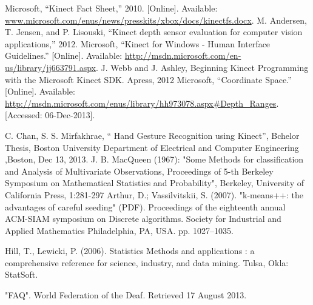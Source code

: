 \documentclass{report}           %
\begin{document}
\begin{thebibliography}{80}
 Microsoft, “Kinect Fact Sheet,” 2010. [Online]. Available: \url{www.microsoft.com/enus/news/presskits/xbox/docs/kinectfs.docx}.
M. Andersen, T. Jensen, and P. Lisouski, “Kinect depth sensor evaluation for computer
vision applications,” 2012.
Microsoft, “Kinect for Windows - Human Interface Guidelines.” [Online]. Available:
\url{http://msdn.microsoft.com/en-us/library/jj663791.aspx}.
J. Webb and J. Ashley, Beginning Kinect Programming with the Microsoft Kinect SDK.
Apress, 2012
Microsoft, “Coordinate Space.” [Online]. Available: \url{http://msdn.microsoft.com/enus/library/hh973078.aspx#Depth\_Ranges}.
[Accessed: 06-Dec-2013].

C. Chan, S. S. Mirfakhrae, “ Hand Gesture Recognition using
Kinect”, Bchelor Thesis, Boston University Department of
Electrical and Computer Engineering ,Boston, Dec 13, 2013.
J. B. MacQueen (1967): "Some Methods for classification and Analysis of Multivariate Observations, Proceedings of 5-th Berkeley Symposium on Mathematical Statistics and Probability", Berkeley, University of California Press, 1:281-297
Arthur, D.; Vassilvitskii, S. (2007). "k-means++: the advantages of careful seeding" (PDF). Proceedings of the eighteenth annual ACM-SIAM symposium on Discrete algorithms. Society for Industrial and Applied Mathematics Philadelphia, PA, USA. pp. 1027–1035.

Hill, T.,  Lewicki, P. (2006). Statistics Methods and applications : a comprehensive reference for science, industry, and data mining. Tulsa, Okla: StatSoft.

 "FAQ". World Federation of the Deaf. Retrieved 17 August 2013.
 
 
\end{thebibliography}
\end{document}
